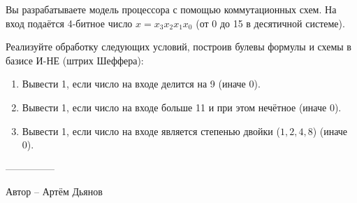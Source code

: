\question
Вы разрабатываете модель процессора с помощью коммутационных схем. На вход подаётся 4-битное число $x=x_3x_2x_1x_0$ (от 0 до 15 в десятичной системе).

Реализуйте обработку следующих условий, построив булевы формулы и схемы в базисе И-НЕ (штрих Шеффера):
\begin{enumerate}
\item Вывести 1, если число на входе делится на 9 (иначе 0).
\item Вывести 1, если число на входе больше 11 и при этом нечётное (иначе 0).
\item Вывести 1, если число на входе является степенью двойки ($1,2,4,8$) (иначе 0).
\end{enumerate}

---------------

Автор -- Артём Дьянов
